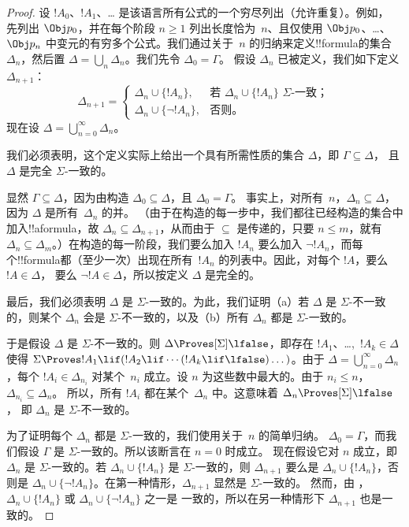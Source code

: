 \documentclass[../../../include/open-logic-section]{subfiles}
\begin{document}
\begin{proof}
设 $!A_0$、$!A_1$、\dots{} 是该语言所有公式的一个穷尽列出（允许重复）。例如，
先列出 $\Obj p_0$，并在每个阶段 $n \ge 1$ 列出长度恰为~$n$、且仅使用 $\Obj p_0$、\dots、$\Obj p_n$
中变元的有穷多个公式。我们通过关于~$n$ 的归纳来定义!!{formula}的集合
$\Delta_n$，然后置 $\Delta = \bigcup_n \Delta_n$。我们先令 $\Delta_0 = \Gamma$。
假设 $\Delta_n$ 已被定义，我们如下定义 $\Delta_{n+1}$：
\[
\Delta_{n+1} =
\begin{cases}
  \Delta_n \cup \{!A_n\}, & \text{若 $\Delta_n \cup \{ !A_n\}$
    $\Sigma$-一致；}\\
  \Delta_n \cup \{ \lnot !A_n\}, & \text{否则。}
\end{cases}
\]
现在设 $\Delta = \bigcup_{n=0}^\infty \Delta_n$。

我们必须表明，这个定义实际上给出一个具有所需性质的集合 $\Delta$，即 $\Gamma \subseteq \Delta$，
且 $\Delta$ 是完全 $\Sigma$-一致的。

显然 $\Gamma \subseteq \Delta$，因为由构造 $\Delta_0 \subseteq \Delta$，且 $\Delta_0 = \Gamma$。
事实上，对所有~$n$，$\Delta_n \subseteq \Delta$，因为 $\Delta$ 是所有~$\Delta_n$ 的并。
（由于在构造的每一步中，我们都往已经构造的集合中加入!!a{formula}，故 $\Delta_n \subseteq
\Delta_{n+1}$，从而由于 $\subseteq$ 是传递的，只要 $n \le m$，就有 $\Delta_n \subseteq
\Delta_{m}$。）在构造的每一阶段，我们要么加入 $!A_n$ 要么加入 $\lnot !A_n$，而每个!!{formula}都（至少一次）出现在所有~$!A_n$ 的列表中。因此，对每个 $!A$，要么 $!A \in \Delta$，
要么 $\lnot !A \in \Delta$，所以按定义 $\Delta$ 是完全的。

最后，我们必须表明 $\Delta$ 是 $\Sigma$-一致的。为此，我们证明（a）若 $\Delta$ 是
$\Sigma$-不一致的，则某个 $\Delta_n$ 会是 $\Sigma$-不一致的，以及（b）所有 $\Delta_n$
都是 $\Sigma$-一致的。

于是假设 $\Delta$ 是 $\Sigma$-不一致的。则 $\Delta \Proves[\Sigma] \lfalse$，即存在
$!A_1$、\dots,~$!A_k \in \Delta$ 使得 $\Sigma \Proves !A_1 \lif (!A_2 \lif \cdots (!A_k
\lif \lfalse)\dots)$。由于 $\Delta = \bigcup_{n=0}^\infty \Delta_n$，每个 $!A_i \in \Delta_{n_i}$
对某个~$n_i$ 成立。设 $n$ 为这些数中最大的。由于 $n_i \le n$，$\Delta_{n_i} \subseteq \Delta_n$。
所以，所有 $!A_i$ 都在某个~$\Delta_n$ 中。这意味着 $\Delta_n \Proves[\Sigma] \lfalse$，
即 $\Delta_n$ 是 $\Sigma$-不一致的。

为了证明每个 $\Delta_n$ 都是 $\Sigma$-一致的，我们使用关于~$n$ 的简单归纳。
$\Delta_0 = \Gamma$，而我们假设 $\Gamma$ 是 $\Sigma$-一致的。所以该断言在 $n = 0$ 时成立。
现在假设它对 $n$ 成立，即 $\Delta_n$ 是 $\Sigma$-一致的。若 $\Delta_n \cup \{!A_n\}$ 是
$\Sigma$-一致的，则 $\Delta_{n+1}$ 要么是 $\Delta_n \cup \{!A_n\}$，否则是
$\Delta_n \cup \{\lnot!A_n\}$。在第一种情形，$\Delta_{n+1}$ 显然是 $\Sigma$-一致的。
然而，由
，
$\Delta_n \cup \{!A_n\}$ 或 $\Delta_n \cup \{\lnot!A_n\}$ 之一是
一致的，所以在另一种情形下 $\Delta_{n+1}$ 也是一致的。
\end{proof}
\end{document}
